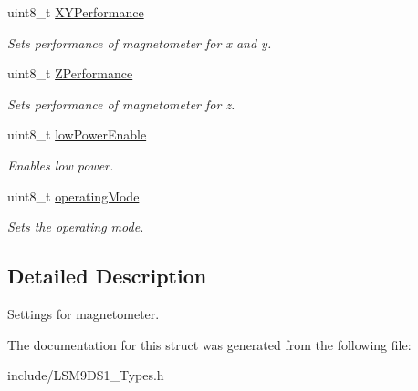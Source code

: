 \begin{DoxyCompactItemize}
\mbox{\label{structmagSettings_ad36c7bb251858fb289841c91fb615a5f}} 
uint8\+\_\+t \hyperlink{structmagSettings_ad36c7bb251858fb289841c91fb615a5f}{X\+Y\+Performance}
\begin{DoxyCompactList}\small\item\em Sets performance of magnetometer for x and y. \end{DoxyCompactList}\item 
\mbox{\label{structmagSettings_a0ab41f0670a3fd20ce1a43332f6fe949}} 
uint8\+\_\+t \hyperlink{structmagSettings_a0ab41f0670a3fd20ce1a43332f6fe949}{Z\+Performance}
\begin{DoxyCompactList}\small\item\em Sets performance of magnetometer for z. \end{DoxyCompactList}\item 
\mbox{\label{structmagSettings_abd59df268c0798fceacea68b956009df}} 
uint8\+\_\+t \hyperlink{structmagSettings_abd59df268c0798fceacea68b956009df}{low\+Power\+Enable}
\begin{DoxyCompactList}\small\item\em Enables low power. \end{DoxyCompactList}\item 
\mbox{\label{structmagSettings_ae3f0044de2fbdff6d7b830c36f26c450}} 
uint8\+\_\+t \hyperlink{structmagSettings_ae3f0044de2fbdff6d7b830c36f26c450}{operating\+Mode}
\begin{DoxyCompactList}\small\item\em Sets the operating mode. \end{DoxyCompactList}\end{DoxyCompactItemize}


\subsection{Detailed Description}
Settings for magnetometer. 

The documentation for this struct was generated from the following file\+:\begin{DoxyCompactItemize}
\item 
include/L\+S\+M9\+D\+S1\+\_\+\+Types.\+h\end{DoxyCompactItemize}
